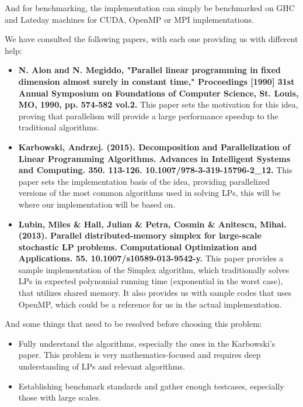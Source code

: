 \documentclass[11pt]{article}
\begin{document}
	And for benchmarking, the implementation can simply be benchmarked on GHC and Lateday machines for CUDA, OpenMP or MPI implementations.
	
	We have consulted the following papers, with each one providing us with different help:
	\begin{itemize}
		\item \textbf{N. Alon and N. Megiddo, "Parallel linear programming in fixed dimension almost surely in constant time," Proceedings [1990] 31st Annual Symposium on Foundations of Computer Science, St. Louis, MO, 1990, pp. 574-582 vol.2.} This paper sets the motivation for this idea, proving that parallelism will provide a large performance speedup to the traditional algorithms.
		\item \textbf{Karbowski, Andrzej. (2015). Decomposition and Parallelization of Linear Programming Algorithms. Advances in Intelligent Systems and Computing. 350. 113-126. 10.1007/978-3-319-15796-2\_12. } This paper sets the implementation basis of the idea, providing parallelized versions of the most common algorithms used in solving LPs, this will be where our implementation will be based on.
		\item \textbf{Lubin, Miles \& Hall, Julian \& Petra, Cosmin \& Anitescu, Mihai. (2013). Parallel distributed-memory simplex for large-scale stochastic LP problems. Computational Optimization and Applications. 55. 10.1007/s10589-013-9542-y. } This paper provides a sample implementation of the Simplex algorithm, which traditionally solves LPs in expected polynomial running time (exponential in the worst case), that utilizes shared memory. It also provides us with sample codes that uses OpenMP, which could be a reference for us in the actual implementation.
	\end{itemize}
	And some things that need to be resolved before choosing this problem:
	\begin{itemize}
		\item Fully understand the algorithms, especially the ones in the Karbowski's paper. This problem is very mathematics-focused and requires deep understanding of LPs and relevant algorithms.
		\item Establishing benchmark standards and gather enough testcases, especially those with large scales.
	\end{itemize}
\end{document}
